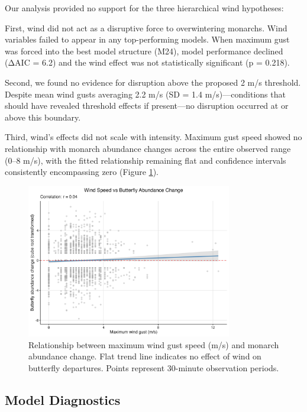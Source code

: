 Our analysis provided no support for the three hierarchical wind hypotheses:

First, wind did not act as a disruptive force to overwintering monarchs. Wind variables failed to appear in any top-performing models. When maximum gust was forced into the best model structure (M24), model performance declined (ΔAIC = 6.2) and the wind effect was not statistically significant (p = 0.218).

Second, we found no evidence for disruption above the proposed 2 m/s threshold. Despite mean wind gusts averaging 2.2 m/s (SD = 1.4 m/s)—conditions that should have revealed threshold effects if present—no disruption occurred at or above this boundary.

Third, wind's effects did not scale with intensity. Maximum gust speed showed no relationship with monarch abundance changes across the entire observed range (0–8 m/s), with the fitted relationship remaining flat and confidence intervals consistently encompassing zero (Figure \ref{fig:wind_scatter}).

\begin{figure}[htbp]
\centering
\includegraphics[width=0.8\textwidth]{supplemental/results/thesis_exports/figures/wind_hypothesis_scatter.png}
\caption{Relationship between maximum wind gust speed (m/s) and monarch abundance change. Flat trend line indicates no effect of wind on butterfly departures. Points represent 30-minute observation periods.}
\label{fig:wind_scatter}
\end{figure}

\subsection{Model Diagnostics}

